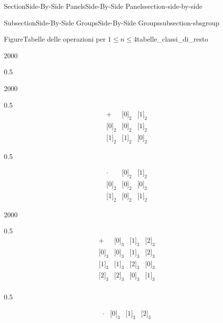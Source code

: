 \documentclass[twoside,10pt,]{article}
\numberwithin{equation}{section}
\newcommand{\class}[2][\sim]{\lbrack #2\rbrack_{#1}}
\newcommand{\amp}{&}
\begin{document}
\begin{sectionptx}{Section}{Side-By-Side Panels}{}{Side-By-Side Panels}{}{}{section-side-by-side}
\begin{subsectionptx}{Subsection}{Side-By-Side Groups}{}{Side-By-Side Groups}{}{}{subsection-sbsgroup}
\begin{figureptx}{Figure}{Tabelle delle operazioni per \(1\le n\le 4\)}{tabelle_classi_di_resto}{}
\begin{sidebyside}{2}{0}{0}{0}
\begin{sbspanel}{0.5}
%
\end{sbspanel}%
\end{sidebyside}%
\begin{sidebyside}{2}{0}{0}{0}%
\begin{sbspanel}{0.5}%
%
\begin{equation*}
\begin{array}{c|cc}
+ \amp \class[2]{0} \amp \class[2]{1} \\
\hline
\class[2]{0} \amp \class[2]{0} \amp \class[2]{1}\\
\class[2]{1} \amp \class[2]{1} \amp \class[2]{0}
\end{array}
\end{equation*}
%
\end{sbspanel}%
\begin{sbspanel}{0.5}%
\par
%
\begin{equation*}
\begin{array}{c|cc}
\cdot \amp \class[2]{0} \amp \class[2]{1} \\
\hline
\class[2]{0} \amp \class[2]{0} \amp \class[2]{0}\\
\class[2]{1} \amp \class[2]{0} \amp \class[2]{1}
\end{array}
\end{equation*}
%
\end{sbspanel}%
\end{sidebyside}%
\begin{sidebyside}{2}{0}{0}{0}%
\begin{sbspanel}{0.5}%
%
\begin{equation*}
\begin{array}{c|ccc}
+ \amp \class[3]{0} \amp \class[3]{1} \amp \class[3]{2} \\
\hline
\class[3]{0} \amp \class[3]{0} \amp \class[3]{1} \amp \class[3]{2} \\
\class[3]{1} \amp \class[3]{1} \amp \class[3]{2} \amp \class[3]{0} \\
\class[3]{2} \amp \class[3]{2} \amp \class[3]{0} \amp \class[3]{1} \\
\end{array}
\end{equation*}
%
\end{sbspanel}%
\begin{sbspanel}{0.5}%
\par
%
\begin{equation*}
\begin{array}{c|ccc}
\cdot \amp \class[3]{0} \amp \class[3]{1} \amp \class[3]{2} \\

\end{array}
\end{equation*}
\end{sbspanel}
\end{sidebyside}
\end{figureptx}
\end{subsectionptx}
\end{sectionptx}
\end{document}
